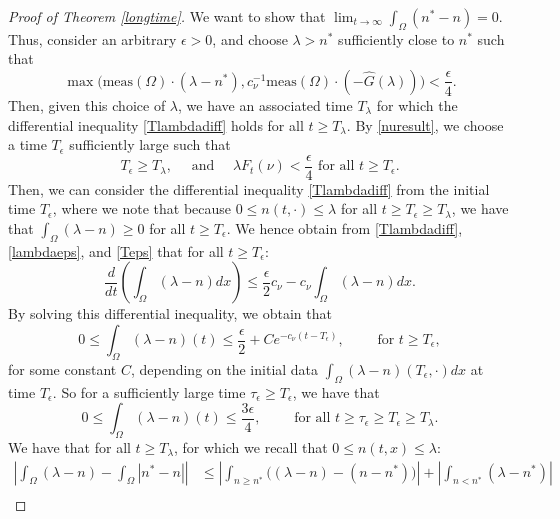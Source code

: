\documentclass[12pt]{article}
\theoremstyle{plain}
\begin{document}
\begin{proof}[Proof of Theorem \ref{longtime}]
We want to show that $\displaystyle \lim_{t \to \infty} \int_{\Omega} (n^{*} - n) = 0$. Thus, consider an arbitrary $\epsilon > 0$, and choose $\lambda > n^{*}$ sufficiently close to $n^{*}$ such that 
\begin{equation}\label{lambdaeps}
\max\Big(\text{meas}(\Omega) \cdot (\lambda - n^{*}), c_{\nu}^{-1} \text{meas}(\Omega) \cdot (-\hat{G}(\lambda))\Big) < \frac{\epsilon}{4}. 
\end{equation}
Then, given this choice of $\lambda$, we have an associated time $T_{\lambda}$ for which the differential inequality \eqref{Tlambdadiff} holds for all $t \ge T_{\lambda}$. By \eqref{nuresult}, we choose a time $T_{\epsilon}$ sufficiently large such that 
\begin{equation}\label{Teps}
T_{\epsilon} \ge T_{\lambda}, \quad \text{ and } \quad \lambda F_{t}(\nu) < \frac{\epsilon}{4} \text{ for all } t \ge T_{\epsilon}.
\end{equation}
Then, we can consider the differential inequality \eqref{Tlambdadiff} from the initial time $T_{\epsilon}$, where we note that because $0 \le n(t, \cdot) \le \lambda$ for all $t \ge T_{\epsilon} \ge T_{\lambda}$, we have that $\displaystyle \int_{\Omega} (\lambda - n) \ge 0$ for all $t \ge T_{\epsilon}$. We hence obtain from \eqref{Tlambdadiff}, \eqref{lambdaeps}, and \eqref{Teps} that for all $t \ge T_{\epsilon}$:
\begin{equation*}
\frac{d}{dt}\left(\int_{\Omega} (\lambda - n) dx\right) \le \frac{\epsilon}{2}c_{\nu} - c_{\nu} \int_{\Omega} (\lambda - n) dx.
\end{equation*}
By solving this differential inequality, we obtain that
\begin{equation*}
0 \le \int_{\Omega} (\lambda - n)(t) \le \frac{\epsilon}{2} + Ce^{-c_{\nu}(t - T_{\epsilon})}, \qquad \text{ for } t \ge T_{\epsilon},
\end{equation*}
for some constant $C$, depending on the initial data $\displaystyle \int_{\Omega} (\lambda - n)(T_{\epsilon}, \cdot) dx$ at time $T_{\epsilon}$.
So for a sufficiently large time $\tau_{\epsilon} \ge T_{\epsilon}$, we have that
\begin{equation}\label{3eps4}
0 \le \int_{\Omega} (\lambda - n)(t) \le \frac{3\epsilon}{4}, \qquad \text{ for all } t \ge \tau_{\epsilon} \ge T_{\epsilon} \ge T_{\lambda}.
\end{equation}
We have that for all $t \ge T_{\lambda}$, for which we recall that $0 \le n(t, x) \le \lambda$:
\begin{align*}
\left|\int_{\Omega} (\lambda - n) - \int_{\Omega} |n^{*} - n|\right| &\le \left|\int_{n \ge n^{*}} \Big((\lambda - n) - (n - n^{*})\Big)\right| + \left|\int_{n < n^{*}} (\lambda - n^{*})\right| \\

\end{align*}
\end{proof}
\end{document}

